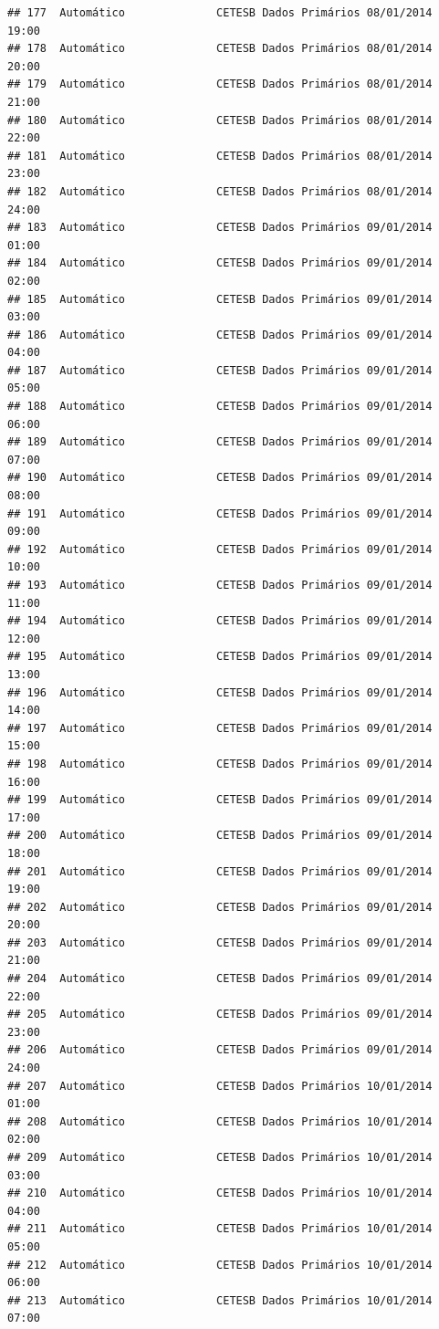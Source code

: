 \documentclass[]{book}
\begin{document}
\begin{verbatim}
## 177  Automático              CETESB Dados Primários 08/01/2014 19:00
## 178  Automático              CETESB Dados Primários 08/01/2014 20:00
## 179  Automático              CETESB Dados Primários 08/01/2014 21:00
## 180  Automático              CETESB Dados Primários 08/01/2014 22:00
## 181  Automático              CETESB Dados Primários 08/01/2014 23:00
## 182  Automático              CETESB Dados Primários 08/01/2014 24:00
## 183  Automático              CETESB Dados Primários 09/01/2014 01:00
## 184  Automático              CETESB Dados Primários 09/01/2014 02:00
## 185  Automático              CETESB Dados Primários 09/01/2014 03:00
## 186  Automático              CETESB Dados Primários 09/01/2014 04:00
## 187  Automático              CETESB Dados Primários 09/01/2014 05:00
## 188  Automático              CETESB Dados Primários 09/01/2014 06:00
## 189  Automático              CETESB Dados Primários 09/01/2014 07:00
## 190  Automático              CETESB Dados Primários 09/01/2014 08:00
## 191  Automático              CETESB Dados Primários 09/01/2014 09:00
## 192  Automático              CETESB Dados Primários 09/01/2014 10:00
## 193  Automático              CETESB Dados Primários 09/01/2014 11:00
## 194  Automático              CETESB Dados Primários 09/01/2014 12:00
## 195  Automático              CETESB Dados Primários 09/01/2014 13:00
## 196  Automático              CETESB Dados Primários 09/01/2014 14:00
## 197  Automático              CETESB Dados Primários 09/01/2014 15:00
## 198  Automático              CETESB Dados Primários 09/01/2014 16:00
## 199  Automático              CETESB Dados Primários 09/01/2014 17:00
## 200  Automático              CETESB Dados Primários 09/01/2014 18:00
## 201  Automático              CETESB Dados Primários 09/01/2014 19:00
## 202  Automático              CETESB Dados Primários 09/01/2014 20:00
## 203  Automático              CETESB Dados Primários 09/01/2014 21:00
## 204  Automático              CETESB Dados Primários 09/01/2014 22:00
## 205  Automático              CETESB Dados Primários 09/01/2014 23:00
## 206  Automático              CETESB Dados Primários 09/01/2014 24:00
## 207  Automático              CETESB Dados Primários 10/01/2014 01:00
## 208  Automático              CETESB Dados Primários 10/01/2014 02:00
## 209  Automático              CETESB Dados Primários 10/01/2014 03:00
## 210  Automático              CETESB Dados Primários 10/01/2014 04:00
## 211  Automático              CETESB Dados Primários 10/01/2014 05:00
## 212  Automático              CETESB Dados Primários 10/01/2014 06:00
## 213  Automático              CETESB Dados Primários 10/01/2014 07:00

\end{verbatim}
\end{document}
